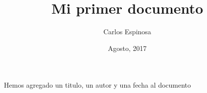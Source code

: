 \documentclass[12pt, letterpaper, twoside]{article}
\title{Mi primer documento}
\author{Carlos Espinosa}
\date{Agosto, 2017}
\begin{document}
 
\maketitle
 
Hemos agregado un titulo, un autor y una fecha al documento
\end{document}
